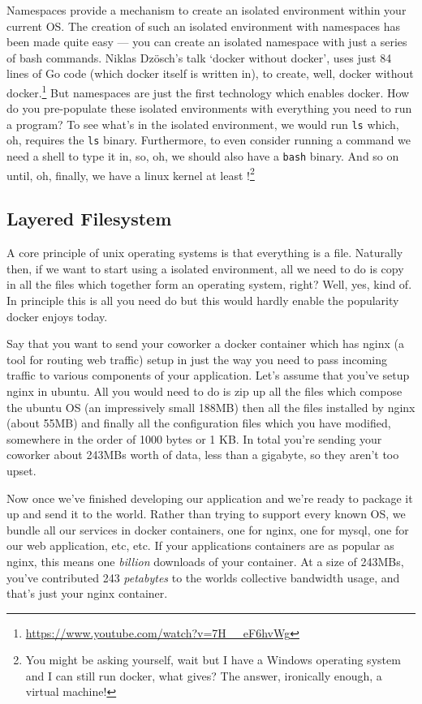 \documentclass{csse4400}
\begin{document}
Namespaces provide a mechanism to create an isolated environment within your current OS.
The creation of such an isolated environment with namespaces has been made quite easy --- you can create an isolated namespace with just a series of bash commands.
Niklas Dz{\"o}sch's talk `docker without docker', uses just 84 lines of Go code (which docker itself is written in),
to create, well, docker without docker.\footnote{\url{https://www.youtube.com/watch?v=7H__eF6hvWg}}
But namespaces are just the first technology which enables docker.
How do you pre-populate these isolated environments with everything you need to run a program?
To see what's in the isolated environment, we would run \texttt{ls} which, oh, requires the \texttt{ls} binary.
Furthermore, to even consider running a command we need a shell to type it in, so, oh, we should also have a \texttt{bash} binary.
And so on until, oh, finally, we have a linux kernel at least%
!\footnote{You might be asking yourself, wait but I have a Windows operating system and I can still run docker, what gives? The answer, ironically enough, a virtual machine!}

\subsection{Layered Filesystem}
A core principle of unix operating systems is that everything is a file.
Naturally then, if we want to start using a isolated environment,
all we need to do is copy in all the files which together form an operating system, right?
Well, yes, kind of.
In principle this is all you need do but this would hardly enable the popularity docker enjoys today.

Say that you want to send your coworker a docker container which has nginx (a tool for routing web traffic)
setup in just the way you need to pass incoming traffic to various components of your application.
Let's assume that you've setup nginx in ubuntu.
All you would need to do is zip up all the files which compose the ubuntu OS (an impressively small 188MB)
then all the files installed by nginx (about 55MB) and finally all the configuration files which you have modified,
somewhere in the order of 1000 bytes or 1 KB.
In total you're sending your coworker about 243MBs worth of data, less than a gigabyte, so they aren't too upset.

Now once we've finished developing our application and we're ready to package it up and send it to the world.
Rather than trying to support every known OS, we bundle all our services in docker containers,
one for nginx, one for mysql, one for our web application, etc, etc.
If your applications containers are as popular as nginx, this means one \textsl{billion} downloads of your container.
At a size of 243MBs, you've contributed 243 \textsl{petabytes} to the worlds collective bandwidth usage, and that's just your nginx container.
\end{document}
